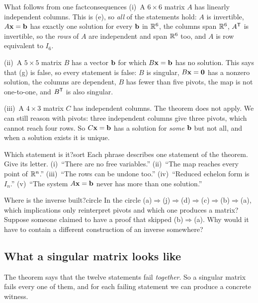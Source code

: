 \documentclass[11pt]{article}
\begin{document}
\begin{exmp}{What follows from one fact}{consequences}
(i)~A $6\times6$ matrix $A$ has linearly independent columns. This is (e), so \emph{all} of the statements hold: $A$ is invertible, $A\mathbf{x}=\mathbf{b}$ has exactly one solution for every $\mathbf{b}$ in $\mathbb{R}^6$, the columns span $\mathbb{R}^6$, $A^{\mathsf T}$ is invertible, so the \emph{rows} of $A$ are independent and span $\mathbb{R}^6$ too, and $A$ is row equivalent to $I_6$.

(ii)~A $5\times5$ matrix $B$ has a vector $\mathbf{b}$ for which $B\mathbf{x}=\mathbf{b}$ has no solution. This says that (g) is false, so every statement is false: $B$ is singular, $B\mathbf{x}=\mathbf{0}$ has a nonzero solution, the columns are dependent, $B$ has fewer than five pivots, the map is not one-to-one, and $B^{\mathsf T}$ is also singular.

(iii)~A $4\times3$ matrix $C$ has independent columns. The theorem does not apply. We can still reason with pivots: three independent columns give three pivots, which cannot reach four rows. So $C\mathbf{x}=\mathbf{b}$ has a solution for \emph{some} $\mathbf{b}$ but not all, and when a solution exists it is unique.
\end{exmp}

\begin{kc}{Which statement is it?}{sort}
Each phrase describes one statement of the theorem. Give its letter. (i)~``There are no free variables.'' (ii)~``The map reaches every point of $\mathbb{R}^n$.'' (iii)~``The rows can be undone too.'' (iv)~``Reduced echelon form is $I_n$.'' (v)~``The system $A\mathbf{x}=\mathbf{b}$ never has more than one solution.''
\end{kc}

\begin{think}{Where is the inverse built?}{circle}
In the circle (a)$\Rightarrow$(j)$\Rightarrow$(d)$\Rightarrow$(c)$\Rightarrow$(b)$\Rightarrow$(a), which implications only reinterpret pivots and which one produces a matrix? Suppose someone claimed to have a proof that skipped (b)$\Rightarrow$(a). Why would it have to contain a different construction of an inverse somewhere?
\end{think}

\subsection*{What a singular matrix looks like}

The theorem says that the twelve statements fail \emph{together}. So a singular matrix fails every one of them, and for each failing statement we can produce a concrete witness.
\end{document}
